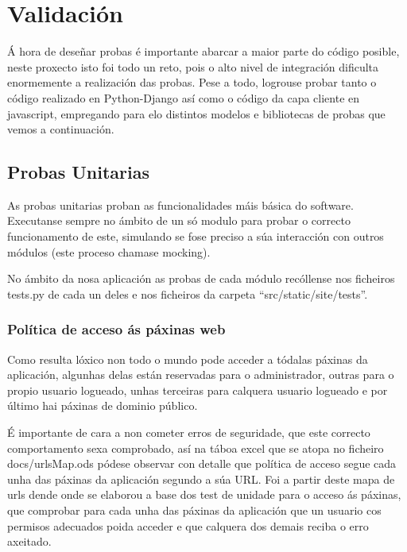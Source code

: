 \chapter{Validación}

Á hora de deseñar probas é importante abarcar a maior parte do código posible, neste proxecto isto
foi todo un reto, pois o alto nivel de integración dificulta enormemente a realización das probas.
Pese a todo, logrouse probar tanto o código realizado en Python-Django así como o código da capa 
cliente en javascript, empregando para elo distintos modelos e bibliotecas de probas que vemos a
continuación.

\section{Probas Unitarias}

    As probas unitarias proban as funcionalidades máis básica do software. Executanse sempre no 
    ámbito de un só modulo para probar o correcto funcionamento de este, simulando se fose preciso 
    a súa interacción con outros módulos (este proceso chamase mocking).
    
    No ámbito da nosa aplicación as probas de cada módulo recóllense nos ficheiros tests.py de cada
    un deles e nos ficheiros da carpeta ``src/static/site/tests''.
    
    \subsection{Política de acceso ás páxinas web}
        Como resulta lóxico non todo o mundo pode acceder a tódalas páxinas da aplicación, algunhas
        delas están reservadas para o administrador, outras para o propio usuario logueado, unhas
        terceiras para calquera usuario logueado e por último hai páxinas de dominio público.
        
        É importante de cara a non cometer erros de seguridade, que este correcto comportamento sexa
        comprobado, así na táboa excel que se atopa no ficheiro docs/urlsMap.ods pódese observar con
        detalle que política de acceso segue cada unha das páxinas da aplicación segundo a súa URL.
        Foi a partir deste mapa de urls dende onde se elaborou a base dos test de unidade para 
        o acceso ás páxinas, que comprobar para cada unha das páxinas da aplicación que un usuario
        cos permisos adecuados poida acceder e que calquera dos demais reciba o erro axeitado.


